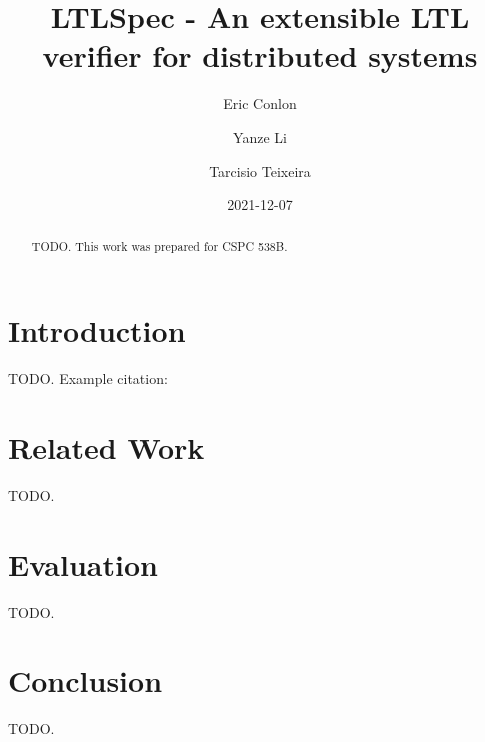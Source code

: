 \documentclass[format=acmsmall, nonacm=true, review=true]{acmart}
\title{LTLSpec - An extensible LTL verifier for distributed systems}
\author{Eric Conlon}
\author{Yanze Li}
\author{Tarcisio Teixeira}
\date{2021-12-07}
\begin{document}
\begin{abstract}
TODO. This work was prepared for CSPC 538B.
\end{abstract}

\maketitle

\section{Introduction}

TODO. Example citation: \cite{thiemann_actor_2016}

\section{Related Work}

TODO.

\section{Evaluation}

TODO.

\section{Conclusion}

TODO.



\end{document}
